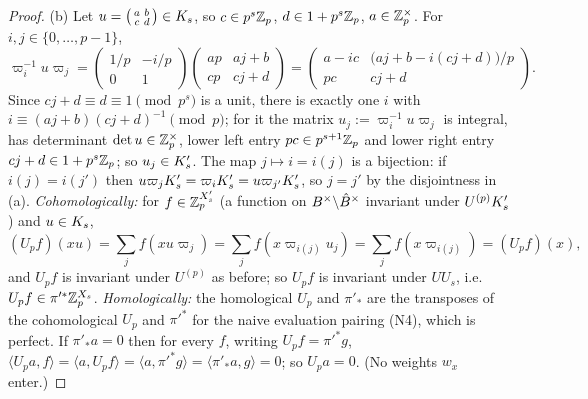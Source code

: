 \begin{proof}
(b) Let $u=\left(\begin{smallmatrix}a&b\\c&d\end{smallmatrix}\right)\in K_{s}$, so $c\in p^s\mathbb{Z}_p$, $d\in1+p^s\mathbb{Z}_p$, $a\in\mathbb{Z}_p^\times$.
For $i,j\in\{0,\dots,p-1\}$,
\[\varpi_i^{-1}u\varpi_j=\begin{pmatrix}1/p&-i/p\\0&1\end{pmatrix}\begin{pmatrix}ap&aj+b\\cp&cj+d\end{pmatrix}
=\begin{pmatrix}a-ic&\big(aj+b-i(cj+d)\big)/p\\pc&cj+d\end{pmatrix}.\]
Since $cj+d\equiv d\equiv1\pmod{p^s}$ is a unit, there is exactly one $i$ with $i\equiv(aj+b)(cj+d)^{-1}\pmod p$; for it the matrix
$u_j:=\varpi_i^{-1}u\varpi_j$ is integral, has determinant $\det u\in\mathbb{Z}_p^\times$, lower left entry $pc\in p^{s+1}\mathbb{Z}_p$ and lower right
entry $cj+d\in1+p^s\mathbb{Z}_p$; so $u_j\in K'_{s}$. The map $j\mapsto i=i(j)$ is a bijection: if $i(j)=i(j')$ then
$u\varpi_jK'_{s}=\varpi_iK'_{s}=u\varpi_{j'}K'_{s}$, so $j=j'$ by the disjointness in (a).
\emph{Cohomologically:} for $f\in\mathbb{Z}_p^{X'_s}$ (a function on $B^\times\backslash\hat{B}^\times$ invariant under $U^{(p)}K'_{s}$) and $u\in K_{s}$,
\[(U_pf)(xu)=\sum_jf(xu\varpi_j)=\sum_jf(x\varpi_{i(j)}u_j)=\sum_jf(x\varpi_{i(j)})=(U_pf)(x),\]
and $U_pf$ is invariant under $U^{(p)}$ as before; so $U_pf$ is invariant under $UU_s$, i.e.\ $U_pf\in\pi'^*\mathbb{Z}_p^{X_s}$.
\emph{Homologically:} the homological $U_p$ and $\pi'_*$ are the transposes of the cohomological $U_p$ and $\pi'^*$ for the naive
evaluation pairing (N4), which is perfect. If $\pi'_*a=0$ then for every $f$, writing $U_pf=\pi'^*g$,
$\langle U_pa,f\rangle=\langle a,U_pf\rangle=\langle a,\pi'^*g\rangle=\langle\pi'_*a,g\rangle=0$; so $U_pa=0$. (No weights $w_x$ enter.)


\end{proof}
